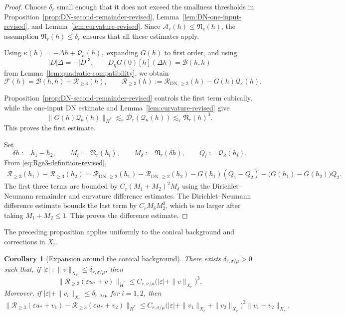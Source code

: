 \documentclass[12pt]{amsart}
\newtheorem{corollary}[theorem]{Corollary}
\theoremstyle{remark}
\theoremstyle{definition}
\numberwithin{equation}{section}
\begin{document}
\begin{proof}
Choose \(\delta_r\) small enough that it does not exceed the smallness
thresholds in Proposition~\ref{prop:DN-second-remainder-revised},
Lemma~\ref{lem:DN-one-input-revised}, and
Lemma~\ref{lem:curvature-revised}.
Since \(\mathcal A_r(h)\leq\mathfrak N_r(h)\), the assumption \(\mathfrak N_r(h)\leq\delta_r\) ensures that all these estimates apply.

Using
\(\kappa(h)=-\Delta h+\mathcal Q_\kappa(h),
\)
expanding \(G(h)\) to first order, and using
\[
 |D|\Delta=-|D|^3,
 \qquad
 D_\eta G(0)[h](\Delta h)=\mathcal B(h,h)
\]
from Lemma~\ref{lem:quadratic-compatibility}, we obtain
\begin{equation}
\label{eq:Rge3-definition-revised}
\mathscr F(h) = \mathcal B(h,h)+\mathscr R_{\geq3}(h), \qquad 
 \mathscr R_{\geq3}(h) := \mathcal R_{\mathrm{DN},\geq2}(h) - G(h)\mathcal Q_\kappa(h).
\end{equation}

Proposition~\ref{prop:DN-second-remainder-revised} controls the first term cubically, while the one-input DN estimate and Lemma~\ref{lem:curvature-revised} give
\[
 \|G(h)\mathcal Q_\kappa(h)\|_{\dot H^r}
 \lesssim_r\mathcal D_r(\mathcal Q_\kappa(h))
 \lesssim_r\mathfrak N_r(h)^3.
\]
This proves the first estimate.

Set
\[
 \delta h:=h_1-h_2, \qquad M_i:=\mathfrak N_r(h_i), \qquad M_\delta:=\mathfrak N_r(\delta h), \qquad Q_i:=\mathcal Q_\kappa(h_i).
\]
From \eqref{eq:Rge3-definition-revised},
\begin{align*}
 \mathscr R_{\geq3}(h_1)-\mathscr R_{\geq3}(h_2) = \mathcal R_{\mathrm{DN},\geq2}(h_1) - \mathcal R_{\mathrm{DN},\geq2}(h_2)- G(h_1)(Q_1-Q_2) - \bigl(G(h_1)-G(h_2)\bigr)Q_2.
\end{align*}
The first three terms are bounded by \(C_r(M_1+M_2)^2M_\delta\) using the Dirichlet--Neumann remainder and curvature difference estimates. 
The Dirichlet--Neumann difference estimate bounds the last term by \(C_rM_\delta M_2^3\), which is no larger after taking \(M_1+M_2\leq1\).  
This proves the difference estimate.
\end{proof}

The preceding proposition applies uniformly to the conical background and corrections in \(X_r\).

\begin{corollary}[Expansion around the conical background]
\label{cor:cone-expansion-revised}
There exists \(\delta_{r,\sigma/\mu}>0\) such that, if
\(|\varepsilon|+\|v\|_{X_r}\leq\delta_{r,\sigma/\mu}\), then
\begin{equation*}
 \|\mathscr R_{\geq3}(\varepsilon u_*+v)\|_{\dot H^r} \leq C_{r,\sigma/\mu} \bigl( |\varepsilon|+\|v\|_{X_r} \bigr)^3.
\end{equation*}
Moreover, if \(|\varepsilon|+\|v_i\|_{X_r}\leq\delta_{r,\sigma/\mu}\) for \(i=1,2\), then
\begin{equation*}
\|\mathscr R_{\geq3}(\varepsilon u_*+v_1) - \mathscr R_{\geq3}(\varepsilon u_*+v_2)\|_{\dot H^r}\leq C_{r,\sigma/\mu} \bigl( |\varepsilon| +\|v_1\|_{X_r} +\|v_2\|_{X_r} \bigr)^2 \|v_1-v_2\|_{X_r}.
\end{equation*}
\end{corollary}
\end{document}
